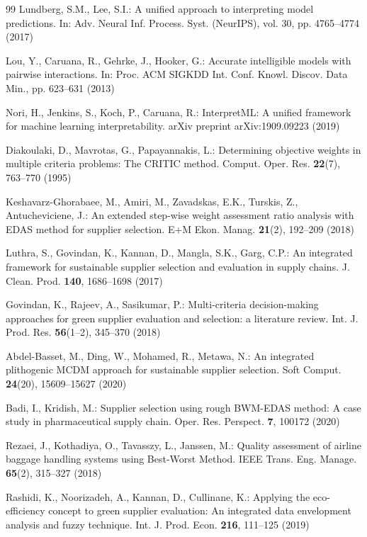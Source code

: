 \documentclass[twocolumn,10pt]{article}
\begin{document}
\begin{thebibliography}{99}
Lundberg, S.M., Lee, S.I.: A unified approach to interpreting model predictions. In: Adv. Neural Inf. Process. Syst. (NeurIPS), vol. 30, pp. 4765--4774 (2017)

Lou, Y., Caruana, R., Gehrke, J., Hooker, G.: Accurate intelligible models with pairwise interactions. In: Proc. ACM SIGKDD Int. Conf. Knowl. Discov. Data Min., pp. 623--631 (2013)

Nori, H., Jenkins, S., Koch, P., Caruana, R.: InterpretML: A unified framework for machine learning interpretability. arXiv preprint arXiv:1909.09223 (2019)

Diakoulaki, D., Mavrotas, G., Papayannakis, L.: Determining objective weights in multiple criteria problems: The CRITIC method. Comput. Oper. Res. \textbf{22}(7), 763--770 (1995)

Keshavarz-Ghorabaee, M., Amiri, M., Zavadskas, E.K., Turskis, Z., Antucheviciene, J.: An extended step-wise weight assessment ratio analysis with EDAS method for supplier selection. E+M Ekon. Manag. \textbf{21}(2), 192--209 (2018)

Luthra, S., Govindan, K., Kannan, D., Mangla, S.K., Garg, C.P.: An integrated framework for sustainable supplier selection and evaluation in supply chains. J. Clean. Prod. \textbf{140}, 1686--1698 (2017)

Govindan, K., Rajeev, A., Sasikumar, P.: Multi-criteria decision-making approaches for green supplier evaluation and selection: a literature review. Int. J. Prod. Res. \textbf{56}(1--2), 345--370 (2018)

Abdel-Basset, M., Ding, W., Mohamed, R., Metawa, N.: An integrated plithogenic MCDM approach for sustainable supplier selection. Soft Comput. \textbf{24}(20), 15609--15627 (2020)

Badi, I., Kridish, M.: Supplier selection using rough BWM-EDAS method: A case study in pharmaceutical supply chain. Oper. Res. Perspect. \textbf{7}, 100172 (2020)

Rezaei, J., Kothadiya, O., Tavasszy, L., Janssen, M.: Quality assessment of airline baggage handling systems using Best-Worst Method. IEEE Trans. Eng. Manage. \textbf{65}(2), 315--327 (2018)

Rashidi, K., Noorizadeh, A., Kannan, D., Cullinane, K.: Applying the eco-efficiency concept to green supplier evaluation: An integrated data envelopment analysis and fuzzy technique. Int. J. Prod. Econ. \textbf{216}, 111--125 (2019)


\end{thebibliography}
\end{document}
